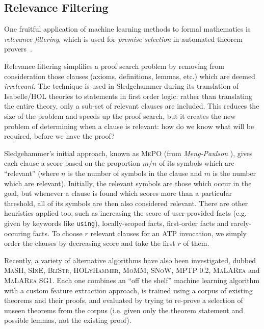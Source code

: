 \subsection{Relevance Filtering}
\label{sec:relevance}

One fruitful application of machine learning methods to formal mathematics is
\emph{relevance filtering}, which is used for \emph{premise selection} in
automated theorem provers~\cite{kuhlwein2012overview}.

Relevance filtering simplifies a proof search problem by removing from
consideration those clauses (axioms, definitions, lemmas, etc.) which are deemed
\emph{irrelevant}. The technique is used in Sledgehammer during its translation
of Isabelle/HOL theories to statements in first order logic: rather than
translating the entire theory, only a sub-set of relevant clauses are
included. This reduces the size of the problem and speeds up the proof search,
but it creates the new problem of determining when a clause is relevant: how do
we know what will be required, before we have the proof?

Sledgehammer's initial approach, known as \textsc{MePO} (from
\emph{Meng-Paulson} \cite{meng2009lightweight}), gives each clause a score based
on the proportion $m / n$ of its symbols which are ``relevant'' (where $n$ is
the number of symbols in the clause and $m$ is the number which are relevant).
Initially, the relevant symbols are those which occur in the goal, but whenever
a clause is found which scores more than a particular threshold, all of its
symbols are then also considered relevant. There are other heuristics applied
too, such as increasing the score of user-provided facts (e.g. given by keywords
like \texttt{using}), locally-scoped facts, first-order facts and
rarely-occuring facts. To choose $r$ relevant clauses for an ATP invocation, we
simply order the clauses by decreasing score and take the first $r$ of them.

Recently, a variety of alternative algorithms have also been investigated,
dubbed \textsc{MaSH}, \textsc{SInE}, \textsc{BliStr}, \textsc{HOLyHammer},
\textsc{MoMM}, \textsc{SNoW}, \textsc{MPTP 0.2}, \textsc{MaLARea} and
\textsc{MaLARea SG1}. Each one combines an ``off the shelf'' machine learning
algorithm with a custom feature extraction approach, is trained using a corpus
of existing theorems and their proofs, and evaluated by trying to re-prove a
selection of unseen theorems from the corpus (i.e. given only the theorem
statement and possible lemmas, not the existing proof).


